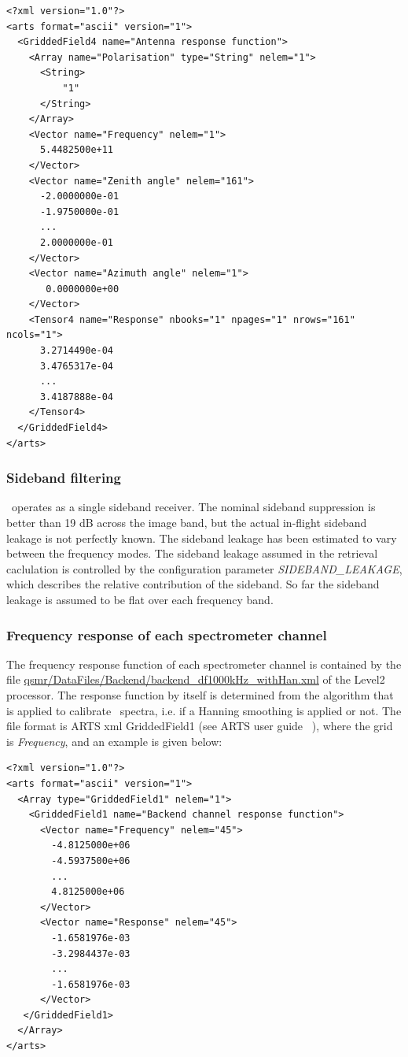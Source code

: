 \lstset{language=XML}
\begin{lstlisting}
<?xml version="1.0"?>
<arts format="ascii" version="1">
  <GriddedField4 name="Antenna response function">
    <Array name="Polarisation" type="String" nelem="1">
      <String>
          "1"
      </String>
    </Array>
    <Vector name="Frequency" nelem="1">
      5.4482500e+11
    </Vector>
    <Vector name="Zenith angle" nelem="161">
      -2.0000000e-01
      -1.9750000e-01
      ...
      2.0000000e-01
    </Vector>
    <Vector name="Azimuth angle" nelem="1">     
       0.0000000e+00
    </Vector>
    <Tensor4 name="Response" nbooks="1" npages="1" nrows="161" ncols="1">
      3.2714490e-04
      3.4765317e-04 
      ...
      3.4187888e-04 
    </Tensor4>
  </GriddedField4>
</arts>
\end{lstlisting}

\subsubsection*{Sideband filtering}


\smr\ operates as a single sideband receiver. The nominal sideband suppression
is better than 19 dB across the image band, but the actual in-flight sideband
leakage is not perfectly known. The sideband leakage has been estimated to vary
between the frequency modes. The sideband leakage assumed in the retrieval
caclulation is controlled by the configuration parameter
\emph{SIDEBAND\_LEAKAGE}, which describes the relative contribution of the
sideband. So far the sideband leakage is assumed to be flat over each frequency
band.

\subsubsection*{Frequency response of each spectrometer channel}

The frequency response function of each spectrometer channel is contained by
the file \url{qsmr/DataFiles/Backend/backend\_df1000kHz\_withHan.xml} of the
Level2 processor. The response function by itself is determined from the
algorithm that is applied to calibrate \smr\ spectra, i.e. if a Hanning
smoothing is applied or not. The file format is ARTS xml GriddedField1 (see
ARTS user guide ~\citep{artsug}), where the grid is \emph{Frequency}, and an
example is given below:

\lstset{language=XML}
\begin{lstlisting}
<?xml version="1.0"?>
<arts format="ascii" version="1">
  <Array type="GriddedField1" nelem="1">
    <GriddedField1 name="Backend channel response function">
      <Vector name="Frequency" nelem="45">
        -4.8125000e+06
        -4.5937500e+06
        ...
        4.8125000e+06
      </Vector>
      <Vector name="Response" nelem="45">
        -1.6581976e-03
        -3.2984437e-03
        ...
        -1.6581976e-03
      </Vector>
   </GriddedField1>
  </Array>
</arts>
\end{lstlisting}


